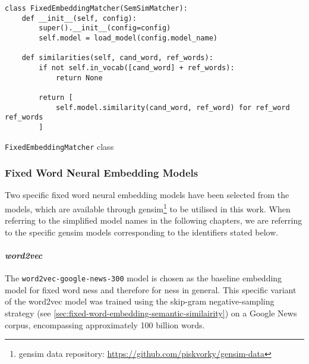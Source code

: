 \documentclass[11pt, numbers=noenddot]{scrreprt}
\begin{document}


\begin{pseudo}
\begin{lstlisting}
class FixedEmbeddingMatcher(SemSimMatcher):    
    def __init__(self, config):
        super().__init__(config=config)
        self.model = load_model(config.model_name)

    def similarities(self, cand_word, ref_words):
        if not self.in_vocab([cand_word] + ref_words):
            return None

        return [
            self.model.similarity(cand_word, ref_word) for ref_word ref_words
        ]
\end{lstlisting}
\caption{\texttt{FixedEmbeddingMatcher} class}
\label{psd:fixedmatcher-class}
\end{pseudo}


\subsubsection{Fixed Word Neural Embedding Models}
Two specific fixed word neural embedding models have been selected from the models, which are available through gensim\footnote{gensim data repository: \url{https://github.com/piskvorky/gensim-data}} 
to be utilised in this work. When referring to the simplified model names in the following chapters, we are referring to the specific gensim models corresponding to the identifiers stated below.

\paragraph{\textit{word2vec}} The \texttt{word2vec-google-news-300} model is chosen as the baseline embedding model for fixed word \gls{ness} and therefore for \gls{ness} in general. This specific variant of the word2vec model was trained using the skip-gram negative-sampling strategy (see \cref{sec:fixed-word-embedding-semantic-similairity}) on a Google News corpus, encompassing approximately 100 billion words.
\end{document}
